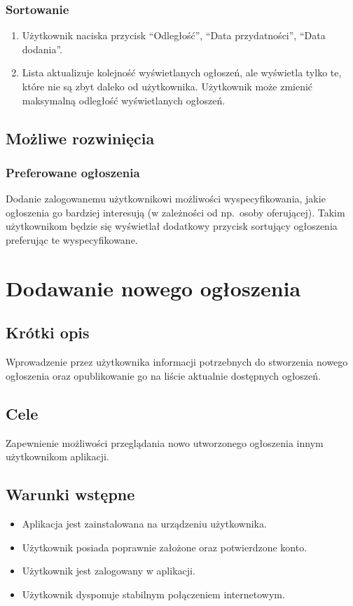\documentclass[12pt,a4paper,twoside]{article}
\begin{document}
    
    \subsubsection{Sortowanie}
    
    
    \begin{enumerate}
        \item Użytkownik naciska przycisk ``Odległość'', ``Data przydatności'', ``Data dodania''.
        \item Lista aktualizuje kolejność wyświetlanych ogłoszeń, ale wyświetla tylko te, które nie są zbyt daleko od użytkownika. Użytkownik może zmienić maksymalną odległość wyświetlanych ogłoszeń.
    \end{enumerate}
    
    
    \subsection{Możliwe rozwinięcia}
    \subsubsection{Preferowane ogłoszenia}
    Dodanie zalogowanemu użytkownikowi możliwości wyspecyfikowania, jakie ogłoszenia go bardziej interesują (w zależności od np.\ osoby oferującej). Takim użytkownikom będzie się wyświetlał dodatkowy przycisk sortujący ogłoszenia preferując te wyspecyfikowane.
    
    
    \section{Dodawanie nowego ogłoszenia}
    
    
    \subsection{Krótki opis}
    Wprowadzenie przez użytkownika informacji potrzebnych do stworzenia nowego ogłoszenia oraz opublikowanie go na liście aktualnie dostępnych
    ogłoszeń.
    
    
    \subsection{Cele}
    Zapewnienie możliwości przeglądania nowo utworzonego ogłoszenia innym użytkownikom aplikacji.
    
    
    \subsection{Warunki wstępne}
    \begin{itemize}
        \item Aplikacja jest zainstalowana na urządzeniu użytkownika.
        \item Użytkownik posiada poprawnie założone oraz potwierdzone konto.
        \item Użytkownik jest zalogowany w aplikacji.
        \item Użytkownik dysponuje stabilnym połączeniem internetowym.
    \end{itemize}
    
\end{document}
